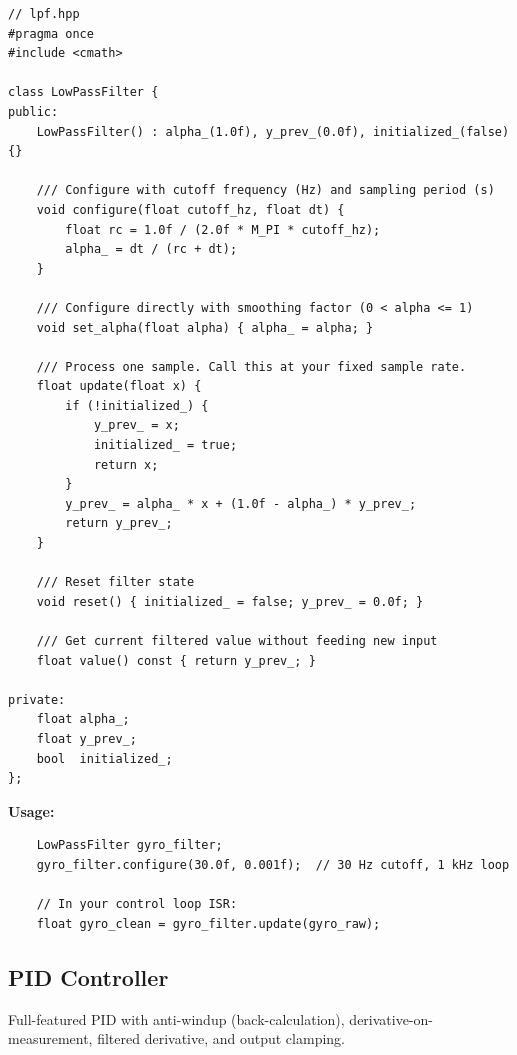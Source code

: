 \begin{verbatim}
// lpf.hpp
#pragma once
#include <cmath>

class LowPassFilter {
public:
    LowPassFilter() : alpha_(1.0f), y_prev_(0.0f), initialized_(false) {}

    /// Configure with cutoff frequency (Hz) and sampling period (s)
    void configure(float cutoff_hz, float dt) {
        float rc = 1.0f / (2.0f * M_PI * cutoff_hz);
        alpha_ = dt / (rc + dt);
    }

    /// Configure directly with smoothing factor (0 < alpha <= 1)
    void set_alpha(float alpha) { alpha_ = alpha; }

    /// Process one sample. Call this at your fixed sample rate.
    float update(float x) {
        if (!initialized_) {
            y_prev_ = x;
            initialized_ = true;
            return x;
        }
        y_prev_ = alpha_ * x + (1.0f - alpha_) * y_prev_;
        return y_prev_;
    }

    /// Reset filter state
    void reset() { initialized_ = false; y_prev_ = 0.0f; }

    /// Get current filtered value without feeding new input
    float value() const { return y_prev_; }

private:
    float alpha_;
    float y_prev_;
    bool  initialized_;
};
\end{verbatim}

\textbf{Usage:}
\begin{verbatim}
    LowPassFilter gyro_filter;
    gyro_filter.configure(30.0f, 0.001f);  // 30 Hz cutoff, 1 kHz loop

    // In your control loop ISR:
    float gyro_clean = gyro_filter.update(gyro_raw);
\end{verbatim}

\subsection{PID Controller}

Full-featured PID with anti-windup (back-calculation), derivative-on-measurement, filtered derivative, and output clamping.

